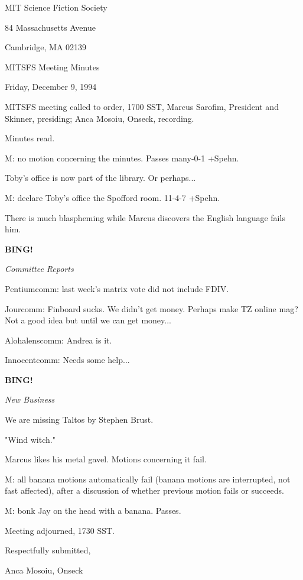 \documentclass[12pt]{article}
\newcommand{\bing}{{\bf BING!} }
\newcommand{\goto}[1]{\bing \vskip 12pt \centerline{{\em{#1}}}}
\begin{document}
\begin{center}

MIT Science Fiction Society 

84 Massachusetts Avenue

Cambridge, MA 02139

\vspace{12pt}

MITSFS Meeting Minutes 

Friday, December 9, 1994

\end{center}
 
\vspace{18pt}

\setlength{\parskip}{6pt}

\noindent
MITSFS meeting called to order, 1700 SST,
Marcus Sarofim, President and Skinner, presiding; Anca Mosoiu, Onseck, recording.

Minutes read.

M: no motion concerning the minutes. Passes many-0-1 +Spehn.

Toby's office is now part of the library. Or perhaps...

M: declare Toby's office the Spofford room. 11-4-7 +Spehn.

There is much blaspheming while Marcus discovers the English language fails him.

\goto{Committee Reports}

Pentiumcomm: last week's matrix vote did not include FDIV.

Jourcomm: Finboard sucks. We didn't get money. Perhaps make TZ online mag? Not a good idea but until we can get money...

Alohalenscomm: Andrea is it.

Innocentcomm: Needs some help...

\goto{New Business}

We are missing Taltos by Stephen Brust.

"Wind witch."

Marcus likes his metal gavel. Motions concerning it fail.

M: all banana motions automatically fail (banana motions are interrupted, not fast affected), after a discussion of whether previous motion fails or succeeds.

M: bonk Jay on the head with a banana. Passes.

\vspace{12pt}

\noindent
Meeting adjourned, 1730 SST.

\vspace{18pt}

\centerline{Respectfully submitted,}
\centerline{Anca Mosoiu, Onseck}
\end{document}

